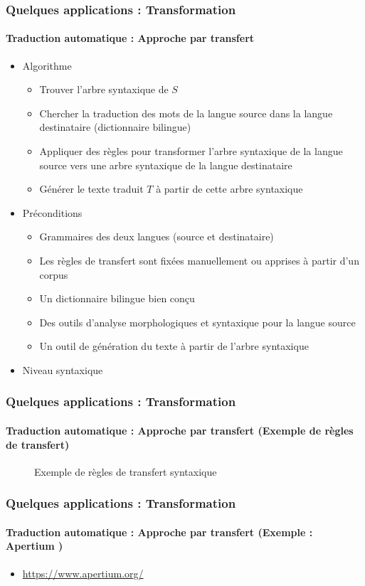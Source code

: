 \documentclass[xcolor=table]{beamer}
\begin{document}
\begin{frame}
	\frametitle{Quelques applications : Transformation}
	\framesubtitle{Traduction automatique : Approche par transfert}
	\begin{itemize}
		\item Algorithme
		\begin{itemize}
			\item Trouver l'arbre syntaxique de $S$
			\item Chercher la traduction des mots de la langue source dans la langue destinataire (dictionnaire bilingue)
			\item Appliquer des règles pour transformer l'arbre syntaxique de la langue source vers une arbre syntaxique de la langue destinataire
			\item Générer le texte traduit $T$ à partir de cette arbre syntaxique
		\end{itemize}
		\item Préconditions 
		\begin{itemize}
			\item Grammaires des deux langues (source et destinataire)
			\item Les règles de transfert sont fixées manuellement ou apprises à partir d'un corpus
			\item Un dictionnaire bilingue bien conçu
			\item Des outils d'analyse morphologiques et syntaxique pour la langue source
			\item Un outil de génération du texte à partir de l'arbre syntaxique
		\end{itemize}
		\item Niveau syntaxique 
	\end{itemize}
\end{frame}

\begin{frame}
	\frametitle{Quelques applications : Transformation}
	\framesubtitle{Traduction automatique : Approche par transfert (Exemple de règles de transfert)}
	
	\begin{figure}
		\centering
		\caption{Exemple de règles de transfert syntaxique \cite{06-quah}}
	\end{figure}
\end{frame}

\begin{frame}
	\frametitle{Quelques applications : Transformation}
	\framesubtitle{Traduction automatique : Approche par transfert (Exemple : Apertium \cite{11-forcada-al})}
	
	\begin{itemize}
		\item \url{https://www.apertium.org/}
	\end{itemize}

\end{frame}
\end{document}
